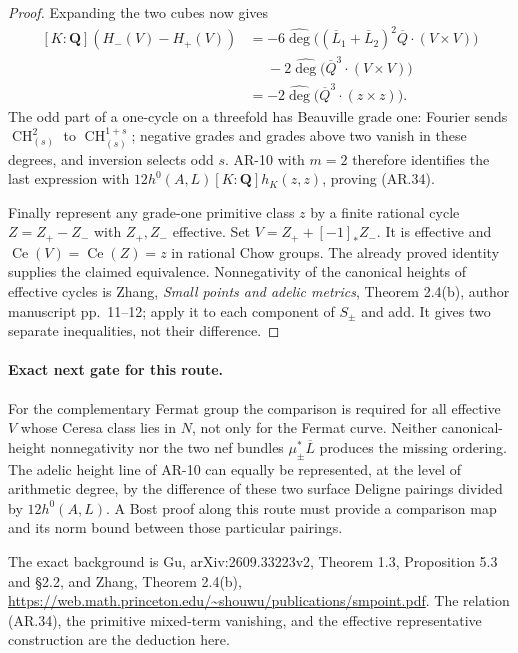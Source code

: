 \documentclass[11pt,a4paper]{article}
\begin{document}
\begin{proof}
Expanding the two cubes now gives
\[
 \begin{split}
 [K:\mathbf Q](H_-(V)-H_+(V))
 &=-6\widehat{\deg}\bigl((\overline L_1+\overline L_2)^2
                           \overline Q\cdot(V\times V)\bigr)\\
 &\phantom{={}}-2\widehat{\deg}\bigl(\overline Q^3
                           \cdot(V\times V)\bigr)\\
 &=-2\widehat{\deg}\bigl(\overline Q^3\cdot(z\times z)\bigr).
 \end{split}
\]
The odd part of a one-cycle on a threefold has Beauville grade one:
Fourier sends $\operatorname{CH}^2_{(s)}$ to
$\operatorname{CH}^{1+s}_{(s)}$; negative grades and grades above two
vanish in these degrees, and inversion selects odd $s$.
AR-10 with $m=2$ therefore identifies the last expression with
$12h^0(A,L)[K:\mathbf Q]h_K(z,z)$, proving (AR.34).

Finally represent any grade-one primitive class $z$ by a finite rational
cycle $Z=Z_+-Z_-$ with $Z_+,Z_-$ effective. Set
$V=Z_++[-1]_*Z_-$. It is effective and
$\operatorname{Ce}(V)=\operatorname{Ce}(Z)=z$ in rational Chow groups.
The already proved identity supplies the claimed equivalence.
Nonnegativity of the canonical heights of effective cycles is Zhang,
\emph{Small points and adelic metrics}, Theorem 2.4(b), author manuscript
pp.~11--12; apply it to each component of $S_\pm$ and add. It gives two
separate inequalities, not their difference.\end{proof}

\paragraph{Exact next gate for this route.}
For the complementary Fermat group the comparison is required for all
effective $V$ whose Ceresa class lies in $N$, not only for the Fermat
curve. Neither canonical-height nonnegativity nor the two nef bundles
$\mu_\pm^*\overline L$ produces the missing ordering. The adelic height
line of AR-10 can equally be represented, at the level of arithmetic
degree, by the difference of these two surface Deligne pairings divided
by $12h^0(A,L)$. A Bost proof along this route must provide a comparison
map and its norm bound between those particular pairings.

The exact background is Gu, arXiv:2609.33223v2, Theorem 1.3,
Proposition 5.3 and \S2.2, and Zhang, Theorem 2.4(b),
\url{https://web.math.princeton.edu/~shouwu/publications/smpoint.pdf}.
The relation (AR.34), the primitive mixed-term vanishing, and the
effective representative construction are the deduction here.
\end{document}
